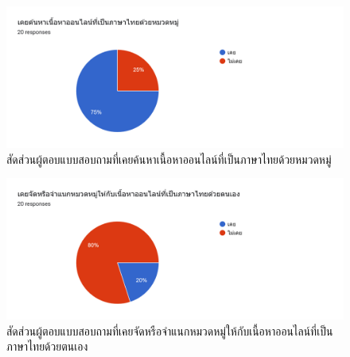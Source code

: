 \documentclass[12pt,oneside,openright,a4paper]{cpe-thai-project}
\begin{document}
\begin{figure}[!ht]\centering
  \includegraphics[width=\textwidth]{./img/test/search.png}
  \caption{สัดส่วนผู้ตอบแบบสอบถามที่เคยค้นหาเนื้อหาออนไลน์ที่เป็นภาษาไทยด้วยหมวดหมู่}\label{fig:user_test_search}
\end{figure}

\newpage
\begin{figure}[!ht]\centering
  \includegraphics[width=\textwidth]{./img/test/tag.png}
  \caption{สัดส่วนผู้ตอบแบบสอบถามที่เคยจัดหรือจำแนกหมวดหมู่ให้กับเนื้อหาออนไลน์ที่เป็นภาษาไทยด้วยตนเอง}\label{fig:user_test_tag}
\end{figure}
\end{document}
